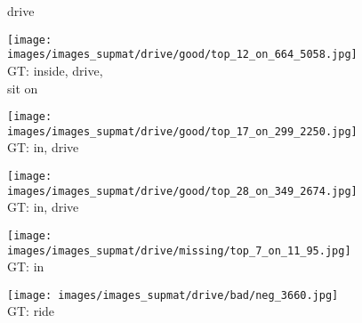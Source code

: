 \documentclass[10pt,twocolumn,letterpaper]{article}
\begin{document}
\begin{figure*}[t]
	\begin{minipage}[t]{0.005\textwidth}
    	\centering
	\vspace{-8.5ex}
    	\begin{turn}{90}
    	drive
    	\end{turn}
    	\vspace{2ex}
   	\end{minipage}
    \hspace{0.01\textwidth}
    \begin{minipage}[t]{0.18\textwidth}
    	\centering
       	\texttt{[image: images/images\_supmat/drive/good/top\_12\_on\_664\_5058.jpg]}\\
       	\vspace{0.3ex}
       	GT: inside, drive, \\
       	sit on
       	\vspace{2ex}
    \end{minipage}
    \hspace{0.005\textwidth}
    \begin{minipage}[t]{0.18\textwidth}
    	\centering
       	\texttt{[image: images/images\_supmat/drive/good/top\_17\_on\_299\_2250.jpg]}\\
       	\vspace{0.3ex}
       	GT: in, drive
       	\vspace{0.2ex}
    \end{minipage}  
    \hspace{0.005\textwidth}
    \begin{minipage}[t]{0.18\textwidth}
    	\centering
       	\texttt{[image: images/images\_supmat/drive/good/top\_28\_on\_349\_2674.jpg]}\\
       	\vspace{0.3ex}
       	GT: in, drive
       	\vspace{0.2ex}
    \end{minipage} 
    \hspace{0.005\textwidth}
    \begin{minipage}[t]{0.18\textwidth}
       	\centering
    	\texttt{[image: images/images\_supmat/drive/missing/top\_7\_on\_11\_95.jpg]}\\
    	\vspace{0.3ex}
       	GT: in
       	\vspace{0.2ex}
    \end{minipage}
    \hspace{0.005\textwidth}
    \begin{minipage}[t]{0.18\textwidth}
    	\centering
       	\texttt{[image: images/images\_supmat/drive/bad/neg\_3660.jpg]}\\
       	\vspace{0.3ex}
       	GT: ride
       	\vspace{0.2ex}
    \end{minipage}   





\end{figure*}
\end{document}
